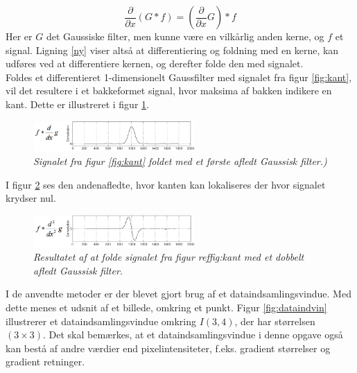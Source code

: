 \begin{equation}
\dfrac{\partial}{\partial x}(G \ast f) = (\dfrac{\partial}{\partial x}G) \ast f
\label{ny}
\end{equation}
Her er $G$ det Gaussiske filter, men kunne være en vilkårlig anden kerne, og $f$ et signal. Ligning \eqref{ny} viser altså at differentiering og foldning med en kerne, kan udføres ved at differentiere kernen, og derefter folde den med signalet.
\\
Foldes et differentieret 1-dimensionelt Gaussfilter med signalet fra figur \ref{fig:kant}, vil det resultere i et bakkeformet signal, hvor maksima af bakken indikere en kant. Dette er illustreret i figur \ref{fig:firstd}.
\begin{figure}[H]
    \centering
    \includegraphics[width=0.55\textwidth]{fig/100.png}
     \vspace{-1em}
    \begin{center}        
     \caption{{\footnotesize \textit{
Signalet fra figur \ref{fig:kant} foldet med et første afledt Gaussisk filter.)}}}
    \label{fig:firstd}
     \end{center}
       \vspace{-2.5em}
  \end{figure}
\noindent
I figur \ref{fig:deriv} ses den andenafledte, hvor kanten kan lokaliseres der hvor signalet krydser nul.
\begin{figure}[H]
    \centering
    \includegraphics[width=0.55\textwidth]{fig/101.png}
    \vspace{-1em}   
    \begin{center}
    \caption{{\footnotesize \textit{
     Resultatet af at folde signalet fra figur ref{fig:kant} med et dobbelt afledt Gaussisk filter.}}}
    \label{fig:deriv}
     \end{center}
    \vspace{-2.5em}  
  \end{figure}
\noindent
I de anvendte metoder er der blevet gjort brug af et dataindsamlingsvindue. Med dette menes et udsnit af et billede, omkring et punkt. Figur \ref{fig:dataindvin} illustrerer et dataindsamlingsvindue omkring $I(3,4)$, der har størrelsen $(3 \times 3)$. Det skal bemærkes, at et dataindsamlingsvindue i denne opgave også kan bestå af andre værdier end pixelintensiteter, f.eks. gradient størrelser og gradient retninger.
